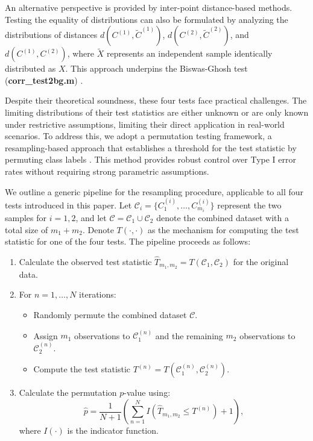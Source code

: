 \documentclass[10pt]{article}
\begin{document}
An alternative perspective is provided by inter-point distance-based methods. Testing the equality of distributions can also be formulated by analyzing the distributions of distances $d(C^{(1)}, \tilde{C}^{(1)})$, $d(C^{(2)}, \tilde{C}^{(2)})$, and $d(C^{(1)}, C^{(2)})$, where $\tilde{X}$ represents an independent sample identically distributed as $X$. This approach underpins the Biswas-Ghosh test (\textbf{corr\_test2bg.m}) \citep{biswas_2014_NonparametricTwosampleTest}.


Despite their theoretical soundness, these four tests face practical challenges. The limiting distributions of their test statistics are either unknown or are only known under restrictive assumptions, limiting their direct application in real-world scenarios. To address this, we adopt a permutation testing framework, a resampling-based approach that establishes a threshold for the test statistic by permuting class labels \citep{pitman_1937_SignificanceTestsWhich}. This method provides robust control over Type I error rates without requiring strong parametric assumptions.

We outline a generic pipeline for the resampling procedure, applicable to all four tests introduced in this paper. Let $\mathcal{C}_i = \lbrace C_1^{(i)}, \ldots, C_{m_i}^{(i)} \rbrace $ represent the two samples for $i=1,2$, and let $\mathcal{C} = \mathcal{C}_1 \cup \mathcal{C}_2$ denote the combined dataset with a total size of $m_1 + m_2$. Denote $T(\cdot, \cdot)$ as the mechanism for computing the test statistic for one of the four tests. The pipeline proceeds as follows:
\begin{enumerate}
	\item Calculate the observed test statistic $\hat{T}_{m_1, m_2} = T(\mathcal{C}_1, \mathcal{C}_2)$ for the original data.
	\item For $n=1, \ldots, N$ iterations:
	\begin{itemize}
		\item Randomly permute the combined dataset $\mathcal{C}$.
		\item Assign $m_1$ observations to $\mathcal{C}_1^{(n)}$ and the remaining $m_2$ observations to $\mathcal{C}_2^{(n)}$.
		\item Compute the test statistic $T^{(n)} = T(\mathcal{C}_1^{(n)}, \mathcal{C}_2^{(n)})$.
	\end{itemize}
	\item Calculate the permutation $p$-value using:
	\begin{equation*}
		\hat{p} = \frac{1}{N+1} \left( \sum_{n=1}^N I(\hat{T}_{m_1, m_2} \leq T^{(n)}) + 1 \right),
	\end{equation*}
	where $I(\cdot)$ is the indicator function.
\end{enumerate}
\end{document}
